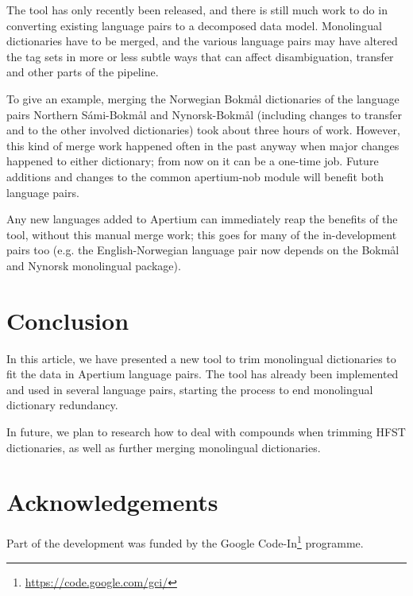 \documentclass[10pt, a4paper]{article}
\begin{document}
The tool has only recently been released, and there is still much work
to do in converting existing language pairs to a decomposed data
model. Monolingual dictionaries have to be merged, and the various
language pairs may have altered the tag sets in more or less subtle
ways that can affect disambiguation, transfer and other parts of the
pipeline. 

To give an example, merging the Norwegian Bokmål dictionaries of the
language pairs Northern Sámi-Bokmål and Nynorsk-Bokmål (including
changes to transfer and to the other involved dictionaries) took about
three hours of work. However, this kind of merge work happened often
in the past anyway when major changes happened to either dictionary;
from now on it can be a one-time job. Future additions and changes to
the common apertium-nob module will benefit both language pairs.

Any new languages added to Apertium can immediately reap the benefits
of the tool, without this manual merge work; this goes for many of the
in-development pairs too (e.g. the English-Norwegian language pair now
depends on the Bokmål and Nynorsk monolingual package).

\section{Conclusion}

In this article, we have presented a new tool to trim monolingual
dictionaries to fit the data in Apertium language pairs. The tool has
already been implemented and used in several language pairs, starting
the process to end monolingual dictionary redundancy.

In future, we plan to research how to deal with compounds when
trimming HFST dictionaries, as well as further merging monolingual
dictionaries.

\section*{Acknowledgements}
Part of the development was funded by the Google
Code-In\footnote{\href{https://code.google.com/gci/}{https://code.google.com/gci/}} programme.



\end{document}
